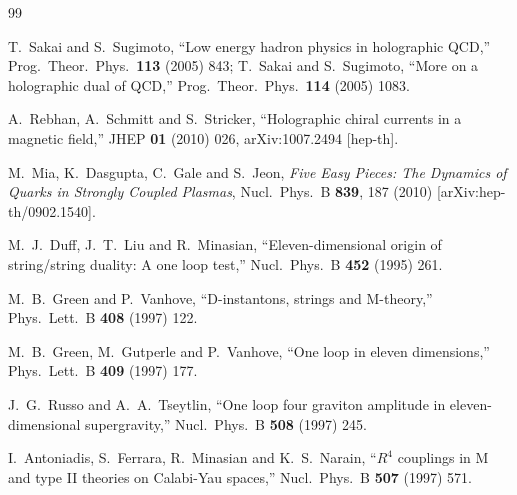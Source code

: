 \documentclass[a4paper,11pt,fleqn]{article}
\theoremstyle{plain}
\theoremstyle{definition}
\begin{document}
\begin{thebibliography}{99}



T.~Sakai and S.~Sugimoto,
``Low energy hadron physics in holographic QCD,''
Prog.\ Theor.\ Phys.\ {\bf 113} (2005) 843;
T.~Sakai and S.~Sugimoto,
``More on a holographic dual of QCD,''
Prog.\ Theor.\ Phys.\ {\bf 114} (2005) 1083.

A.~Rebhan, A.~Schmitt and S.~Stricker,
``Holographic chiral currents in a magnetic field,''
JHEP {\bf 01} (2010) 026,
arXiv:1007.2494 [hep-th].


M.~Mia, K.~Dasgupta, C.~Gale and S.~Jeon, {\it Five Easy Pieces: The Dynamics of Quarks in Strongly Coupled Plasmas}, Nucl.\ Phys.\ B {\bf 839}, 187 (2010) [arXiv:hep-th/0902.1540].

M.~J.~Duff, J.~T.~Liu and R.~Minasian,
``Eleven-dimensional origin of string/string duality: A one loop test,''
Nucl.\ Phys.\ B {\bf 452} (1995) 261.

M.~B.~Green and P.~Vanhove,
``D-instantons, strings and M-theory,''
Phys.\ Lett.\ B {\bf 408} (1997) 122.

M.~B.~Green, M.~Gutperle and P.~Vanhove,
``One loop in eleven dimensions,''
Phys.\ Lett.\ B {\bf 409} (1997) 177.

J.~G.~Russo and A.~A.~Tseytlin,
``One loop four graviton amplitude in eleven-dimensional supergravity,''
Nucl.\ Phys.\ B {\bf 508} (1997) 245.

I.~Antoniadis, S.~Ferrara, R.~Minasian and K.~S.~Narain,
``$R^4$ couplings in M and type II theories on Calabi-Yau spaces,''
Nucl.\ Phys.\ B {\bf 507} (1997) 571.


\end{thebibliography}
\end{document}
